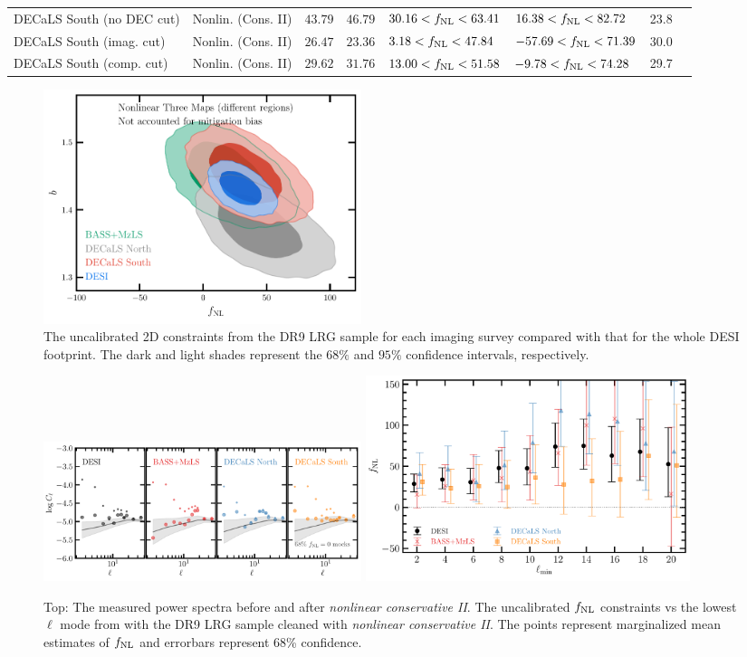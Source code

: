 \begin{table}
{\begin{tabular}{llllllll}
DECaLS South (no DEC cut) & Nonlin. (Cons. II)& $ 43.79$& $ 46.79$& $ 30.16<f_{\rm NL}< 63.41$& $ 16.38<f_{\rm NL}< 82.72$ &   23.8\\
DECaLS South (imag. cut)        & Nonlin. (Cons. II)& $ 26.47$& $ 23.36$& $  3.18<f_{\rm NL}< 47.84$& $-57.69<f_{\rm NL}< 71.39$ &   30.0\\
DECaLS South (comp. cut)       & Nonlin. (Cons. II)& $ 29.62$& $ 31.76$& $ 13.00<f_{\rm NL}< 51.58$& $ -9.78<f_{\rm NL}< 74.28$ &   29.7\\
   \hline
    \end{tabular}}
\end{table}

\begin{figure}
    \centering
    \includegraphics[width=0.45\textwidth]{figures/mcmc_dr9regions.pdf} 
    \caption{The uncalibrated 2D constraints from the DR9 LRG sample for each imaging survey compared with that for the whole DESI footprint. The dark and light shades represent the $68\%$ and $95\%$ confidence intervals, respectively.}\label{fig:mcmc_dr9reg}
\end{figure}
\begin{figure}
    \centering
    \includegraphics[width=0.45\textwidth]{figures/cldr9_lowell.pdf}
    \includegraphics[width=0.46\textwidth]{figures/fnl_elmin.pdf}  
    \caption{Top: The measured power spectra before and after \textit{nonlinear conservative II}. The uncalibrated $f_{\rm NL}$ constraints vs the lowest $\ell$ mode from with the DR9 LRG sample cleaned with \textit{nonlinear conservative II}. The points represent marginalized mean estimates of $f_{\rm NL}$ and errorbars represent $68$\% confidence.}\label{fig:mcmc_dr9elmin}
\end{figure}

